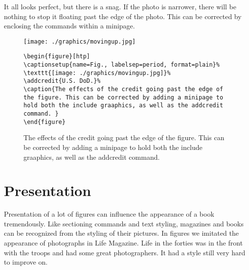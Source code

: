 It all looks perfect, but there is a snag. If the photo is narrower, there will be nothing to stop it floating past the edge of the photo. This can be corrected by enclosing the commands within a minipage.


\begin{figure}[htp]
\begin{commands}[]{}
\captionsetup{name=Fig., labelsep=period, format=plain}%
\texttt{[image: ./graphics/movingup.jpg]}%
%
\caption{The effects of the credit going past the edge of the figure. This can be corrected by adding a minipage to hold both the include graaphics, as well as the addcredit command. }

\begin{verbatim}
\begin{figure}[htp]
\captionsetup{name=Fig., labelsep=period, format=plain}%
\texttt{[image: ./graphics/movingup.jpg]}%
\addcredit{U.S. DoD.}%
\caption{The effects of the credit going past the edge of the figure. This can be corrected by adding a minipage to hold both the include graaphics, as well as the addcredit command. }
\end{figure}
\end{verbatim}
\end{commands}
\end{figure}

\section{Presentation}

Presentation of a lot of figures can influence the appearance of a book tremendously. Like sectioning commands and text styling, magazines and books can be recognized from the styling of their pictures. In figures we imitated the appearance of photographs in Life Magazine. Life in the forties was in the front with the troops and had some great photographers.  It had a style still very hard to improve on.

